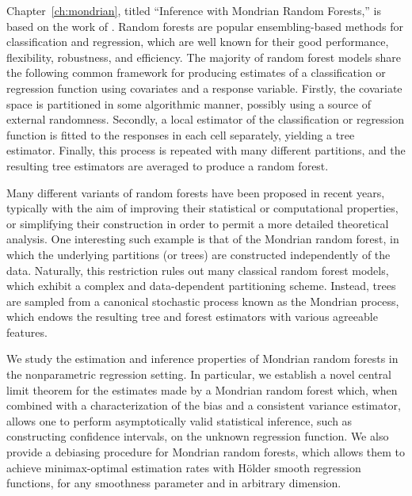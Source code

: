 \documentclass[11pt,lof]{puthesis}
\theoremstyle{break}
\theoremstyle{proof}
\begin{document}
Chapter~\ref{ch:mondrian}, titled ``Inference with Mondrian Random Forests,''
is based on the work of \citet{cattaneo2023inference}.
Random forests are popular ensembling-based methods for classification and
regression, which are well known for their good performance, flexibility,
robustness, and efficiency. The majority of random forest models share the
following common framework for producing estimates of a classification or
regression function using covariates and a response variable. Firstly, the
covariate space is partitioned in some algorithmic manner, possibly using a
source of external randomness. Secondly, a local estimator of the
classification or regression function is fitted to the responses in each cell
separately, yielding a tree estimator. Finally, this process is repeated with
many different partitions, and the resulting tree estimators are averaged to
produce a random forest.

Many different variants of random forests have been proposed in recent years,
typically with the aim of improving their statistical or computational
properties, or simplifying their construction in order to permit a more
detailed theoretical analysis.
One interesting such example is that of the Mondrian random forest, in which
the underlying partitions (or trees) are constructed independently of the data.
Naturally, this restriction rules out many classical random forest models,
which exhibit a complex and data-dependent partitioning scheme. Instead, trees
are sampled from a canonical stochastic process known as the Mondrian process,
which endows the resulting tree and forest estimators with various agreeable
features.

We study the estimation and inference properties of Mondrian random forests in
the nonparametric regression setting. In particular, we establish a novel
central limit theorem for the estimates made by a Mondrian random forest which,
when combined with a characterization of the bias and a consistent variance
estimator, allows one to perform asymptotically valid statistical inference,
such as constructing confidence intervals, on the unknown regression function.
We also provide a debiasing procedure for Mondrian random forests, which allows
them to achieve minimax-optimal estimation rates with H{\"o}lder smooth
regression functions, for any smoothness parameter and in arbitrary dimension.
\end{document}
